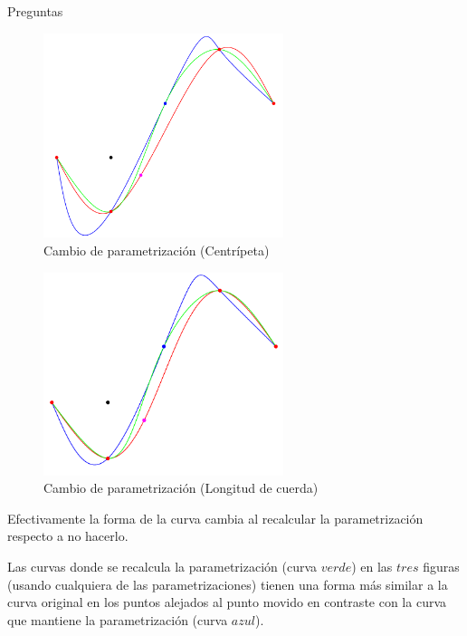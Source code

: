 \begin{section}{Preguntas}
\begin{itemize}
	\VSP
	
	\begin{figure}[H]
		  \centering
			\includegraphics[width=7cm]{graficos/paramVSreparamCentripetal.pdf}
		  \caption{Cambio de parametrización (Centrípeta)}
		  \label{fig:paramChangeCentripetal}
	\end{figure}
	
	\VSP
	
	\begin{figure}[H]
		  \centering
			\includegraphics[width=7cm]{graficos/paramVSreparamChord.pdf}
		  \caption{Cambio de parametrización (Longitud de cuerda)}
		  \label{fig:paramChangeCHLength}
	\end{figure}
	
	\VSP
	
	Efectivamente la forma de la curva cambia al recalcular la parametrización respecto a no hacerlo. 
	
	Las curvas donde se recalcula la parametrización (curva $verde$) en las $tres$ figuras (usando cualquiera de las parametrizaciones) tienen una forma más similar a la curva original en los puntos alejados 
	al punto movido en contraste con la curva que mantiene la parametrización (curva $azul$). 

	\end{itemize}	
\end{section}
